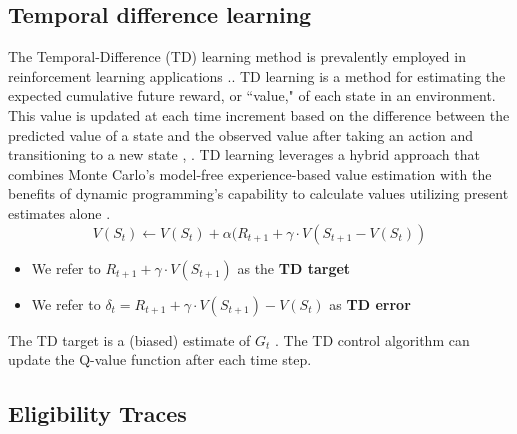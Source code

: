 \subsection{Temporal difference learning}

The Temporal-Difference (TD) learning method is prevalently employed in reinforcement learning applications \cite{RL3}.. TD learning is a method for estimating the expected cumulative future reward, or ``value," of each state in an environment. This value is updated at each time increment based on the difference between the predicted value of a state and the observed value after taking an action and transitioning to a new state \cite{RL}, \cite{RL2}.
TD learning leverages a hybrid approach that combines Monte Carlo's model-free experience-based value estimation with the benefits of dynamic programming's capability to calculate values utilizing present estimates alone \cite{sutton1988b}. 
\begin{equation}
    V(S_t) \leftarrow V(S_t) + \alpha(R_{t+1} + \gamma \cdot V(S_{t+1} - V(S_t))
\end{equation}
\begin{itemize}
    \item We refer to $R_{t+1} + \gamma \cdot V(S_{t+1})$ as the \textbf{TD target}
    \item We refer to $\delta_{t} = R_{t+1} + \gamma \cdot V(S_{t+1}) - V(S_{t})$ as  \textbf{TD error}
\end{itemize}
The TD target is a (biased) estimate of $G_t$ \cite{RL}. The TD control algorithm can update the Q-value function after each time step. 




\subsection{Eligibility Traces}